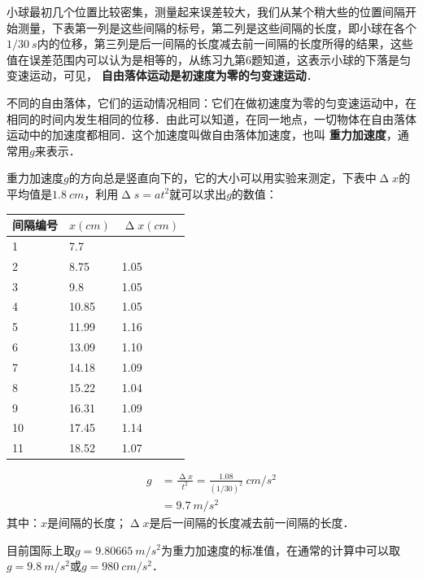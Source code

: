 小球最初几个位置比较密集，测量起来误差较大，我们从某个稍大些的位置间隔开始测量，下表第一列是这些间隔的标号，第二列是这些间隔的长度，即小球在各个$1/30~\si{s}$内的位移，第三列是后一间隔的长度减去前一间隔的长度所得的结果，这些值在误差范围内可以认为是相等的，从练习九第6题知道，这表示小球的下落是匀变速运动，可见，\textbf{ 自由落体运动是初速度为零的匀变速运动}．

不同的自由落体，它们的运动情况相同：它们在做初速度为零的匀变速运动中，在相同的时间内发生相同的位移．由此可以知道，在同一地点，一切物体在自由落体运动中的加速度都相同．这个加速度叫做自由落体加速度，也叫\textbf{ 重力加速度}，通常用$g$来表示．

重力加速度$g$的方向总是竖直向下的，它的大小可以用实验来测定，下表中$\upDelta x$的平均值是$\qty{1.8}{cm}$，利用$\upDelta s=at^2$就可以求出$g$的数值：
\begin{table}[H]
    \centering
    \begin{tabularx}{\textwidth}{MMM}
        \toprule[1.5pt]
        间隔编号 & $x(\si{cm})$ & $\upDelta x(\si{cm})$ \\
            & 7.7          &                       \\
        2    & 8.75         & 1.05
        \\
        3    & 9.8          & 1.05
        \\
        4    & 10.85        & 1.05
        \\
        5    & 11.99        & 1.16
        \\
        6    & 13.09        & 1.10
        \\
        7    & 14.18        & 1.09
        \\
        8    & 15.22        & 1.04
        \\
        9    & 16.31        & 1.09
        \\
        10   & 17.45        & 1.14
        \\
        11   & 18.52        & 1.07                  \\
        \bottomrule[1.5pt]
    \end{tabularx}
\end{table}
\[\begin{split}
        g & =\frac{\upDelta x}{t^2}=\frac{1.08}{(1/30)^2}~\si{cm/s^2} \\
          & =\qty{9.7}{m/s^2}
    \end{split} \]
其中：$x$是间隔的长度；$\upDelta x$是后一间隔的长度减去前一间隔的长度．

目前国际上取$g=\qty{9.80665}{m/s^2}$为重力加速度的标准值，在通常的计算中可以取$g=\qty{9.8}{m/s^2}$或$g=\qty{980}{cm/s^2}$．

